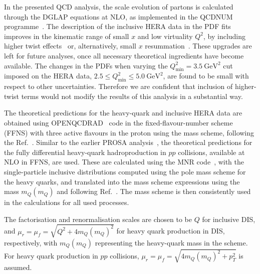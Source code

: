 In the presented QCD analysis, the scale evolution of partons is calculated through the DGLAP equations at NLO, as implemented in 
the QCDNUM programme~\cite{Botje:2010ay}.  
The description of the inclusive HERA data in the PDF fits improves in the kinematic range of small $x$ and low virtuality $Q^2$, by including higher twist effects~\cite{Accardi:2016ndt,Alekhin:2017kpj}
or, alternatively, small $x$ resummation~\cite{Ball:2017otu,Abdolmaleki:2018jln}. 
These upgrades are left for future analyses, once all necessary theoretical ingredients have become available. 
The changes in the PDFs when varying the $Q^2_{\text{min}} = 3.5~\textrm{GeV}^2$ cut imposed on the HERA data, $2.5 \leq Q^2_\textrm{min}\leq 5.0~\textrm{GeV}^2$, are found to be small with respect to other uncertainties. 
Therefore we are confident that inclusion of higher-twist terms would not modify the results of this analysis in a substantial way.

The theoretical predictions for the heavy-quark and inclusive HERA data are obtained using OPENQCDRAD~\cite{openqcdrad} code in the 
fixed-flavour-number scheme (FFNS) with three active flavours in the proton using the \msbar mass scheme, following the Ref.~\cite{H1:2018flt}. 
Similar to the earlier PROSA analysis~\cite{Zenaiev:2015rfa}, the theoretical predictions for the fully differential 
heavy-quark hadroproduction in $pp$ collisions, available at NLO in FFNS, are used. These are calculated using 
the MNR code~\cite{Mangano:1991jk}, with the single-particle inclusive distributions computed using the pole mass scheme for the heavy quarks, 
and translated into the \msbar mass scheme expressions using the \msbar mass $m_Q(m_Q)$ and following Ref.~\cite{Dowling:2013baa}.
The \msbar mass scheme is then consistently used in the calculations for all used processes.

The factorisation and renormalisation scales are chosen to be $Q$ for inclusive DIS, and $\mu_r = \mu_f = \sqrt{Q^2 + 4m_Q(m_Q)^2}$ for heavy quark production in DIS, respectively, with $m_Q(m_Q)$ representing the heavy-quark mass in the \msbar scheme. 
For heavy quark production in $pp$ collisions, $\mu_r = \mu_f = \sqrt{4m_Q(m_Q)^2+p_T^2}$ is assumed. 


